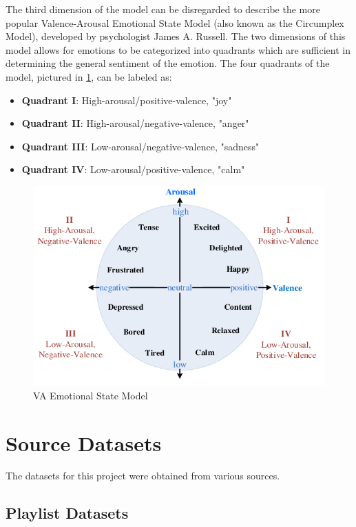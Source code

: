 \documentclass[11pt]{article}
\begin{document}
The third dimension of the model can be disregarded to describe the more popular Valence-Arousal Emotional State Model (also known as the Circumplex Model), developed by psychologist James A. Russell. The two dimensions of this model allows for emotions to be categorized into quadrants which are sufficient in determining the general sentiment of the emotion. The four quadrants of the model, pictured in \ref{fig:va}, can be labeled as:
\begin{itemize}
  \item \textbf{Quadrant I}: High-arousal/positive-valence, "joy"
  \item \textbf{Quadrant II}: High-arousal/negative-valence, "anger"
  \item \textbf{Quadrant III}: Low-arousal/negative-valence, "sadness"
  \item \textbf{Quadrant IV}: Low-arousal/positive-valence, "calm"
\end{itemize}

\begin{figure}[!ht]
  \includegraphics[scale=0.45]{../statics/va_.png}
  \centering
  \caption{VA Emotional State Model}
  \label{fig:va}
\end{figure}

\section{Source Datasets}

The datasets for this project were obtained from various sources.

\subsection{Playlist Datasets}
\end{document}
